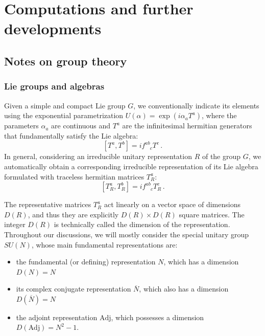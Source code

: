 \section{Computations and further developments} \label{app:computations}

\subsection*{Notes on group theory}\label{app:group_theory}

\subsubsection{Lie groups and algebras}

Given a simple and compact Lie group \(G\), we conventionally indicate its elements using the exponential parametrization \(U(\alpha) = \exp(i\alpha_a T^a)\), where the parameters \(\alpha_a\) are continuous and \(T^a\) are the infinitesimal hermitian generators that fundamentally satisfy the Lie algebra:
\begin{equation} \label{eq:lie_algebra}
    [T^a, T^b] = i f^{ab}_{\phantom{ab}c} T^c \, .
\end{equation}
In general, considering an irreducible unitary representation \(R\) of the group \(G\), we automatically obtain a corresponding irreducible representation of its Lie algebra formulated with traceless hermitian matrices \(T_R^a\):
\begin{equation} \label{eq:lie_algebra_rep}
    [T_R^a, T_R^b] = i f^{ab}_{\phantom{ab}c} T_R^c \, .
\end{equation}

The representative matrices \(T_R^a\) act linearly on a vector space of dimensions \(D(R)\), and thus they are explicitly \(D(R) \times D(R)\) square matrices. The integer \(D(R)\) is technically called the dimension of the representation. Throughout our discussions, we will mostly consider the special unitary group \(SU(N)\), whose main fundamental representations are:
\begin{itemize}
    \item the fundamental (or defining) representation \(N\), which has a dimension \(D(N) = N\)
    \item its complex conjugate representation \(\overline{N}\), which also has a dimension \(D(\overline{N}) = N\)
    \item the adjoint representation \(\text{Adj}\), which possesses a dimension \(D(\text{Adj}) = N^2 - 1\).
\end{itemize}

